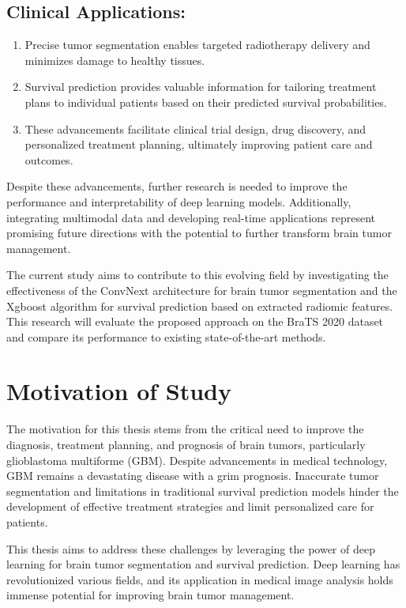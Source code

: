 \documentclass[12pt,oneside]{report}
\begin{document}
\subsection{Clinical Applications:}
\begin{enumerate}
\item Precise tumor segmentation enables targeted radiotherapy delivery and minimizes damage to healthy tissues.

\item Survival prediction provides valuable information for tailoring treatment plans to individual patients based on their predicted survival probabilities.

\item These advancements facilitate clinical trial design, drug discovery, and personalized treatment planning, ultimately improving patient care and outcomes.

\end{enumerate}

Despite these advancements, further research is needed to improve the performance and interpretability of deep learning models. Additionally, integrating multimodal data and developing real-time applications represent promising future directions with the potential to further transform brain tumor management.

The current study aims to contribute to this evolving field by investigating the effectiveness of the ConvNext architecture for brain tumor segmentation and the Xgboost algorithm for survival prediction based on extracted radiomic features. This research will evaluate the proposed approach on the BraTS 2020 dataset and compare its performance to existing state-of-the-art methods.

\section{Motivation of Study}
The motivation for this thesis stems from the critical need to improve the diagnosis, treatment planning, and prognosis of brain tumors, particularly glioblastoma multiforme (GBM). Despite advancements in medical technology, GBM remains a devastating disease with a grim prognosis. Inaccurate tumor segmentation and limitations in traditional survival prediction models hinder the development of effective treatment strategies and limit personalized care for patients.

This thesis aims to address these challenges by leveraging the power of deep learning for brain tumor segmentation and survival prediction. Deep learning has revolutionized various fields, and its application in medical image analysis holds immense potential for improving brain tumor management.
\end{document}
